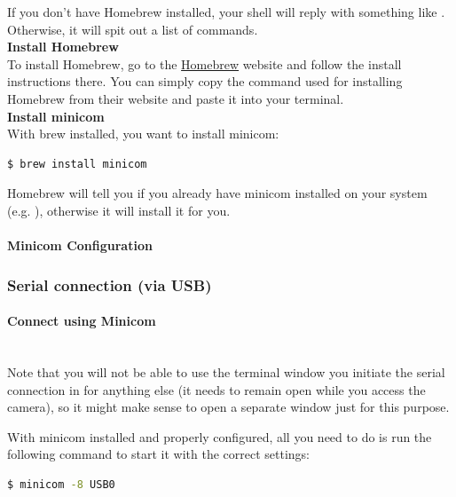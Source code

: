 If you don't have Homebrew installed, your shell will reply with something like . Otherwise, it will spit out a list of  commands.\\ 

\textbf{Install Homebrew}\\

To install Homebrew, go to the \href{https://brew.sh/}{Homebrew} website and follow the install instructions there. You can simply copy the command used for installing Homebrew from their website and paste it into your terminal.\\

\textbf{Install minicom}\\

With brew installed, you want to install minicom:

\begin{lstlisting}[language=bash,morekeywords=$,keywordstyle=\bfseries,frame=none,xleftmargin=.25in,belowskip=2em, aboveskip=2em]
$ brew install minicom
\end{lstlisting}

Homebrew will tell you if you already have minicom installed on your system (e.g. ), otherwise it will install it for you. 


\paragraph{Minicom Configuration}
\subsubsection{Serial connection (via USB)}
\paragraph{Connect using Minicom}\mbox{}\\
Note that you will not be able to use the terminal window you initiate the serial connection in for anything else (it needs to remain open while you access the camera), so it might make sense to open a separate window just for this purpose.

With minicom installed and properly configured, all you need to do is run the following command to start it with the correct settings:

\begin{lstlisting}[language=bash,morekeywords=$,keywordstyle=\bfseries,frame=none,xleftmargin=.25in,belowskip=2em, aboveskip=2em]
$ minicom -8 USB0
\end{lstlisting}

